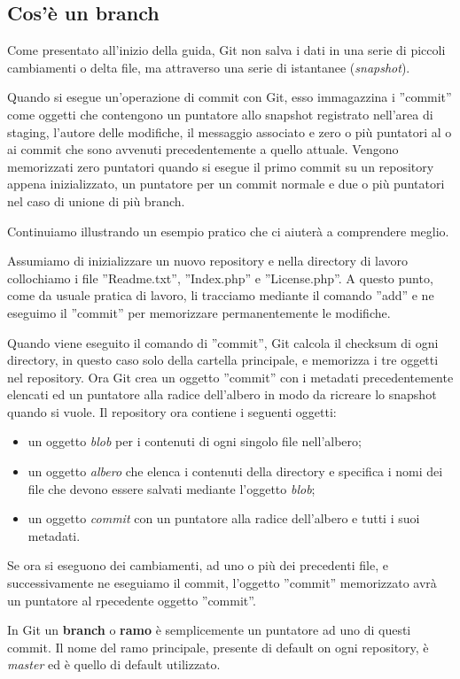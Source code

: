 \subsection{Cos'è un branch}
Come presentato all'inizio della guida, Git non salva i dati in una serie di piccoli cambiamenti o delta file, ma attraverso una serie di istantanee (\textit{snapshot}).

Quando si esegue un'operazione di commit con Git, esso immagazzina i ''commit'' come oggetti che contengono un puntatore allo snapshot registrato nell'area di staging, l'autore delle modifiche, il messaggio associato e zero o più puntatori al o ai commit che sono avvenuti precedentemente a quello attuale. Vengono memorizzati zero puntatori quando si esegue il primo commit su un repository appena inizializzato, un puntatore per un commit normale e due o più puntatori nel caso di unione di più branch.

Continuiamo illustrando un esempio pratico che ci aiuterà a comprendere meglio. 

Assumiamo di inizializzare un nuovo repository e nella directory di lavoro collochiamo i file ''Readme.txt'', ''Index.php'' e ''License.php''. A questo punto, come da usuale pratica di lavoro, li tracciamo mediante il comando ''add'' e ne eseguimo il ''commit'' per memorizzare permanentemente le modifiche.

Quando viene eseguito il comando di ''commit'', Git calcola il checksum di ogni directory, in questo caso solo della cartella principale, e memorizza i tre oggetti nel repository. Ora Git crea un oggetto ''commit'' con i metadati precedentemente elencati ed un puntatore alla radice dell'albero in modo da ricreare lo snapshot quando si vuole. Il repository ora contiene i seguenti oggetti:

\begin{itemize}
\item un oggetto \textit{blob} per i contenuti di ogni singolo file nell'albero;
\item un oggetto \textit{albero} che elenca i contenuti della directory e specifica i nomi dei file che devono essere salvati mediante l'oggetto \textit{blob};
\item un oggetto \textit{commit} con un puntatore alla radice dell'albero e tutti i suoi metadati.
\end{itemize}

Se ora si eseguono dei cambiamenti, ad uno o più dei precedenti file, e successivamente ne eseguiamo il commit, l'oggetto ''commit'' memorizzato avrà un puntatore al rpecedente oggetto ''commit''.

In Git un \textbf{branch} o \textbf{ramo} è semplicemente un puntatore ad uno di questi commit. Il nome del ramo principale, presente di default on ogni repository, è \textit{master} ed è quello di default utilizzato.
